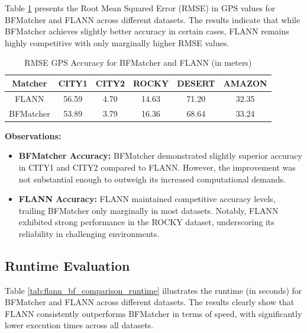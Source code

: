 \begin{itemize}
Table \ref{tab:flann_bf_comparison_acc} presents the Root Mean Squared Error (RMSE) in GPS values for BFMatcher and FLANN across different datasets. The results indicate that while BFMatcher achieves slightly better accuracy in certain cases, FLANN remains highly competitive with only marginally higher RMSE values.

\begin{table}[H]
    \centering
    \caption{RMSE GPS Accuracy for BFMatcher and FLANN (in meters)}
    \label{tab:flann_bf_comparison_acc}
    \begin{tabular}{|c|c|c|c|c|c|}
    \hline
    \textbf{Matcher} & \textbf{CITY1} & \textbf{CITY2} & \textbf{ROCKY} & \textbf{DESERT} & \textbf{AMAZON} \\ \hline
    FLANN          & 56.59           & 4.70           & 14.63          & 71.20           & 32.35           \\ \hline
    BFMatcher      & 53.89           & 3.79           & 16.36          & 68.64           & 33.24           \\ \hline
    \end{tabular}
\end{table}

\textbf{Observations:}
\begin{itemize}
    \item \textbf{BFMatcher Accuracy:} BFMatcher demonstrated slightly superior accuracy in CITY1 and CITY2 compared to FLANN. However, the improvement was not substantial enough to outweigh its increased computational demands.
    \item \textbf{FLANN Accuracy:} FLANN maintained competitive accuracy levels, trailing BFMatcher only marginally in most datasets. Notably, FLANN exhibited strong performance in the ROCKY dataset, underscoring its reliability in challenging environments.
\end{itemize}

\subsection{Runtime Evaluation}

Table \ref{tab:flann_bf_comparison_runtime} illustrates the runtime (in seconds) for BFMatcher and FLANN across different datasets. The results clearly show that FLANN consistently outperforms BFMatcher in terms of speed, with significantly lower execution times across all datasets.


\end{itemize}
